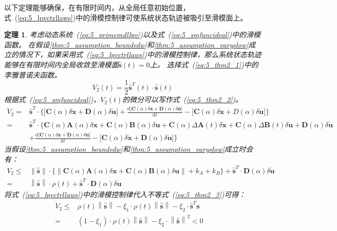 \documentclass{article}
\newtheorem{theorem}{定理}
\begin{document}
以下定理能够确保，在有限时间内，从全局任意初始位置，式~(\ref{eq:5_lpvctrllaws})中的滑模控制律可使系统状态轨迹被吸引至滑模面上。
\begin{theorem}
考虑动态系统~(\ref{eq:5_primemdllpv})以及式~(\ref{eq:5_smfuncideal})中的滑模函数。
在假设\ref{thm:5_assumption_boundedw}和\ref{thm:5_assumption_varyslow}成立的情况下，如果采用式~(\ref{eq:5_lpvctrllaws})中的滑模控制律，那么系统状态轨迹能够在有限时间内全局收敛至滑模面$\bm{\hat s}(t)=0$上。
\proof
选择式~(\ref{eq:5_thm2_1})中的李雅普诺夫函数。
\begin{equation}
V_2(t)=\frac{1}{2}\bm{\hat s}^{T}(t)\cdot \bm{\hat s}(t)
\label{eq:5_thm2_1}
\end{equation}
根据式~(\ref{eq:5_smfuncideal})，$V_2(t)$的微分可以写作式~(\ref{eq:5_thm2_2})。
\begin{equation}
\begin{aligned}
\dot V_2=&\bm{\hat s}^{T}\cdot \Big \{ \big [ \mathbf{C}(\alpha)\delta \bm{\dot x}+\mathbf{D}(\alpha)\delta \bm{\dot u} \big ]+\frac{\mathrm{d} \big [\mathbf{C}(\alpha)\delta \bm{x}+\mathbf{D}(\alpha)\delta \bm{u} \big ]}{\mathrm{d} t}- \big [\mathbf{C}(\alpha)\delta \bm{\dot x}+D(\alpha)\delta \bm{\dot u} \big ]\Big \} \\
=&\bm{\hat s}^{T}\cdot \Big \{  \mathbf{C}(\alpha)\mathbf{A}(\alpha)\delta \bm{x}+\mathbf{C}(\alpha)\mathbf{B}(\alpha)\delta \bm{u}+\mathbf{C}(\alpha)\Delta \mathbf{A}(t)\delta \bm{x}+\mathbf{C}(\alpha)\Delta \mathbf{B}(t)\delta \bm{u}+\mathbf{D}(\alpha)\delta \bm{\dot u}\\
&+\frac{\mathrm{d} \big [\mathbf{C}(\alpha)\delta \bm{x}+\mathbf{D}(\alpha)\delta \bm{u}\big ]}{\mathrm{d} t}- \big [\mathbf{C}(\alpha)\delta \bm{\dot x}+\mathbf{D}(\alpha)\delta \bm{\dot u}\big ] \Big \}
\label{eq:5_thm2_2}
\end{aligned}
\end{equation}
当假设\ref{thm:5_assumption_boundedw}和\ref{thm:5_assumption_varyslow}成立时会有：
\begin{equation}
\begin{aligned}
\dot V_2\leq& \Big \| \bm{\hat s} \Big \| \cdot \Big \{ \Big \|\mathbf{C}(\alpha)\mathbf{A}(\alpha)\delta \bm{x}+\mathbf{C}(\alpha)\mathbf{B}(\alpha)\delta \bm{u}\Big \| + k_A +k_B \Big \} +\bm{\hat s}^{T}\cdot \mathbf{D}(\alpha)\delta \bm{\dot{u}}\\
= & \left \| \bm{\hat s} \right \|\cdot\rho(t)+\bm{\hat s}^{T}\cdot \mathbf{D}(\alpha)\delta \bm{\dot{u}}
\label{eq:5_thm2_3}
\end{aligned}
\end{equation}
将式~(\ref{eq:5_lpvctrllaws})中的滑模控制律代入不等式~(\ref{eq:5_thm2_3})可得：
\begin{equation}
\begin{aligned}
\dot V_2\leq& \rho(t) \left \| \bm{\hat s} \right \|-\xi_1\cdot \rho (t)\left \| \bm{\hat s} \right \| -\xi_2\cdot\bm{\hat s}^{T}\bm{\hat s}\\
= &(1 - \xi_1)\cdot \rho(t)\left \| \bm{\hat s} \right \| -\xi_2\cdot\left \| \bm{\hat s} \right \|^{2}<0 \quad 
\label{eq:5_thm2_4}
\end{aligned}
\end{equation}


\end{theorem}
\end{document}
